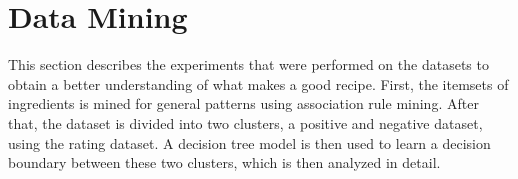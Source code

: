 

\section{Data Mining}
\label{sec:data_mining}

This section describes the experiments that were performed on the datasets to obtain a better understanding of what makes a good recipe.
First, the itemsets of ingredients is mined for general patterns using association rule mining.
After that, the dataset is divided into two clusters, a positive and negative dataset, using the rating dataset.
A decision tree model is then used to learn a decision boundary between these two clusters, which is then analyzed in detail.